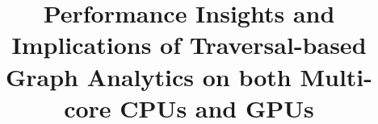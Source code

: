 \documentclass[acmsmall, screen, review, anonymous]{acmart}
\theoremstyle{plain} %
\begin{document}
 \title{Performance Insights and Implications of Traversal-based Graph Analytics on both Multi-core CPUs and GPUs}











\maketitle















\newpage



\clearpage
\appendix




\end{document}
